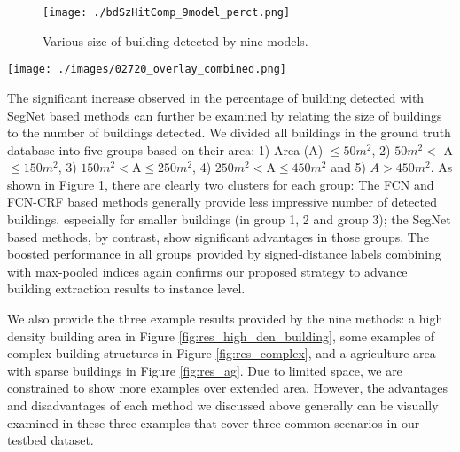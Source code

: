 \documentclass[journal]{IEEEtran}
\begin{document}
\begin{figure}[tp!]
	\texttt{[image: ./bdSzHitComp\_9model\_perct.png]}
	\caption{Various size of building detected by nine models.}
	\label{fig:no_building_detected_area}
\end{figure}
\begin{figure*}[t!]
	\texttt{[image: ./images/02720\_overlay\_combined.png]}
	\caption{Example: Agriculture area where red lines delineate the  building extraction results and blue lines denote the ground truth.}
	\label{fig:res_ag}
\end{figure*}
The significant increase observed in the percentage of building detected with SegNet based methods can further be examined by relating the size of buildings to the number of buildings detected. We divided all buildings in the ground truth database into five groups based on their area: 1) Area (A) $\leq 50 m^2$, 2) $50m^2<$ A$\leq 150m^2$, 3) $150m^2<$A$\leq 250m^2$, 4) $250m^2<$A$\leq 450m^2$ and 5) $A>450m^2$. As shown in Figure \ref{fig:no_building_detected_area}, there are clearly two clusters for each group: The FCN and FCN-CRF based methods generally provide less impressive number of detected buildings, especially for smaller buildings (in group 1, 2 and group 3); the SegNet based methods, by contrast, show significant advantages in those groups. The boosted performance in all groups provided by signed-distance labels combining with max-pooled indices again confirms our proposed strategy to advance building extraction results to instance level.

We also provide the three example results provided by the nine methods: a high density building area in Figure \ref{fig:res_high_den_building}, some examples of complex building structures in Figure \ref{fig:res_complex}, and a agriculture area with sparse buildings in Figure \ref{fig:res_ag}. Due to limited space, we are constrained to show more examples over extended area. However, the advantages and disadvantages of each method we discussed above generally can be visually examined in these three examples that cover three common scenarios in our testbed dataset.  
\end{document}
